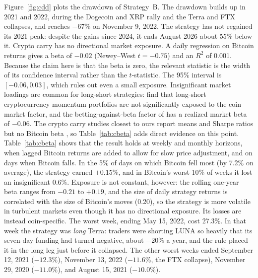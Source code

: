 \documentclass[11pt]{article}
\begin{document}
Figure~\ref{fig:cdd} plots the drawdown of Strategy~B. The drawdown builds up in 2021 and 2022, during the Dogecoin and XRP rally and the Terra and FTX collapses, and reaches $-67$\% on November 9, 2022. The strategy has not regained its 2021 peak: despite the gains since 2024, it ends August 2026 about 55\% below it. Crypto carry has no directional market exposure. A daily regression on Bitcoin returns gives a beta of $-0.02$ (Newey--West $t=-0.75$) and an $R^2$ of 0.001. Because the claim here is that the beta is zero, the relevant statistic is the width of its confidence interval rather than the $t$-statistic. The 95\% interval is $[-0.06, 0.03]$, which rules out even a small exposure. Insignificant market loadings are common for long-short strategies: \citet{LiuTsyvinskiWu2022} find that long-short cryptocurrency momentum portfolios are not significantly exposed to the coin market factor, and the betting-against-beta factor of \citet{FrazziniPedersen2014} has a realized market beta of $-0.06$. The crypto carry studies closest to ours report means and Sharpe ratios but no Bitcoin beta \citep{Christin2023,Borri2025}, so Table~\ref{tab:cbeta} adds direct evidence on this point. Table~\ref{tab:cbeta} shows that the result holds at weekly and monthly horizons, when lagged Bitcoin returns are added to allow for slow price adjustment, and on days when Bitcoin falls. In the 5\% of days on which Bitcoin fell most (by 7.2\% on average), the strategy earned $+0.15$\%, and in Bitcoin's worst 10\% of weeks it lost an insignificant 0.6\%. Exposure is not constant, however: the rolling one-year beta ranges from $-0.21$ to $+0.19$, and the size of daily strategy returns is correlated with the size of Bitcoin's moves (0.20), so the strategy is more volatile in turbulent markets even though it has no directional exposure. Its losses are instead coin-specific. The worst week, ending May 15, 2022, cost 27.3\%. In that week the strategy was \emph{long} Terra: traders were shorting LUNA so heavily that its seven-day funding had turned negative, about $-20$\% a year, and the rule placed it in the long leg just before it collapsed. The other worst weeks ended September 12, 2021 ($-12.3$\%), November 13, 2022 ($-11.6$\%, the FTX collapse), November 29, 2020 ($-11.0$\%), and August 15, 2021 ($-10.0$\%).
\end{document}
